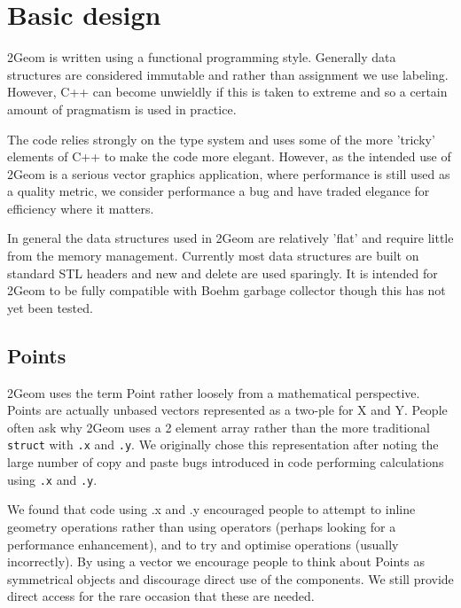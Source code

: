 
\newcommand{\code}[1]{\textsf{#1}}



\chapter{Basic design}

2Geom is written using a functional programming style\cite{}.
Generally data structures are considered immutable and rather than
assignment we use labeling.  However, C++ can become unwieldly if this
is taken to extreme and so a certain amount of pragmatism is used in
practice.

The code relies strongly on the type system and uses some of the more
'tricky' elements of C++ to make the code more elegant.  However, as
the intended use of 2Geom is a serious vector graphics application,
where performance is still used as a quality metric, we consider
performance a bug and have traded elegance for efficiency where it
matters.

In general the data structures used in 2Geom are relatively 'flat' and
require little from the memory management.  Currently most data
structures are built on standard STL headers\cite{stl} and new and
delete are used sparingly.  It is intended for 2Geom to be fully
compatible with Boehm garbage collector\cite{boehm} though this has
not yet been tested.

\section{Points}

2Geom uses the term Point rather loosely from a mathematical
perspective.  Points are actually unbased vectors represented as a
two-ple for X and Y.  People often ask why 2Geom uses a 2 element
array rather than the more traditional \verb|struct| with \verb|.x|
and \verb|.y|.  We originally chose this representation after noting
the large number of copy and paste bugs introduced in code performing
calculations using \verb|.x| and \verb|.y|.

We found that code using .x and .y encouraged people to attempt to
inline geometry operations rather than using operators (perhaps
looking for a performance enhancement), and to try and optimise
operations (usually incorrectly).  By using a vector we encourage
people to think about Points as symmetrical objects and discourage
direct use of the components.  We still provide direct access for the
rare occasion that these are needed.

